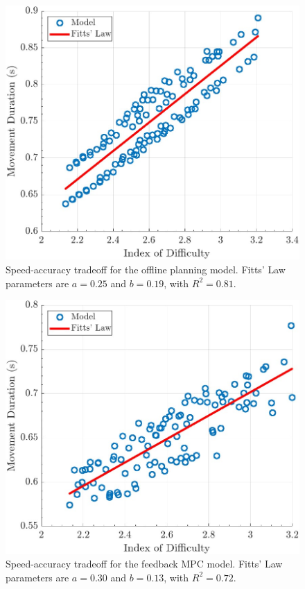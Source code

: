 \documentclass[letterpaper, 10pt, conference]{ieeeconf}
\begin{document}
\begin{figure}[h]
    \centering
    \includegraphics[width=0.8\linewidth]{images/final_fitts_law_single.jpg}
    \caption{Speed-accuracy tradeoff for the offline planning model. Fitts' Law parameters are $a = 0.25$ and $b = 0.19$, with $R^2 = 0.81$.}
    \label{fig:FittsLawSingle}
\end{figure}

\begin{figure}[h]
    \centering
    \includegraphics[width=0.8\linewidth]{images/final_fitts_law_mpc.jpg}
    \caption{Speed-accuracy tradeoff for the feedback MPC model. Fitts' Law parameters are $a = 0.30$ and $b = 0.13$, with $R^2 = 0.72$.}
    \label{fig:FittsLawMPC}
\end{figure}
\end{document}
